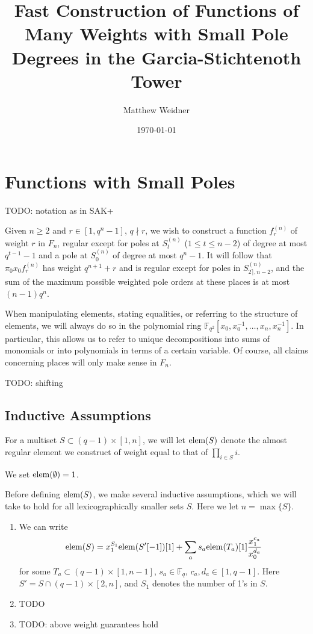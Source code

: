 \documentclass[12pt]{article}
\newcommand{\mb}[1]{\ensuremath{\mathbb{#1}}}
\newcommand{\F}{\mb{F}}
\newcommand{\elem}{\ensuremath{{\rm elem}}}
\theoremstyle{plain}
\theoremstyle{definition}
\begin{document}
\title{Fast Construction of Functions of Many Weights with Small Pole Degrees in the Garcia-Stichtenoth Tower}
\author{Matthew Weidner}
\date{\today}
\maketitle
\vspace{-10pt}


\section{Functions with Small Poles}
TODO: notation as in SAK+

Given $n \ge 2$ and $r \in [1, q^n - 1]$, $q \nmid r$, we wish to construct a function $f^{(n)}_r$ of weight $r$ in $F_n$, regular except for poles at $S^{(n)}_t$ ($1 \le t \le n-2$) of degree at most $q^{t-1} - 1$ and a pole at $S^{(n)}_0$ of degree at most $q^n - 1$.  It will follow that $\pi_0 x_0 f^{(n)}_r$ has weight $q^{n+1} + r$ and is regular except for poles in $S^{(n)}_{2 \rceil, n-2}$, and the sum of the maximum possible weighted pole orders at these places is at most $(n-1)q^n$.

When manipulating elements, stating equalities, or referring to the structure of elements, we will always do so in the polynomial ring $\F_{q^2}[x_0, x_0^{-1}, \dots, x_n, x_n^{-1}]$.  In particular, this allows us to refer to unique decompositions into sums of monomials or into polynomials in terms of a certain variable.  Of course, all claims concerning places will only make sense in $F_n$.

TODO: shifting

\subsection{Inductive Assumptions}
For a multiset $S \subset (q - 1) \times [1, n]$, we will let $\elem(S)$ denote the almost regular element we construct of weight equal to that of $\prod_{i \in S} i$.

We set $\elem(\emptyset) = 1$.

Before defining $\elem(S)$, we make several inductive assumptions, which we will take to hold for all lexicographically smaller sets $S$.  Here we let $n = \max\{S\}$.
\begin{enumerate}[(A1)]
  \item We can write
  \[
  \elem(S) = x_1^{S_1} \elem(S'[-1])[1] + \sum_a s_a \elem(T_a)[1] \frac{x_1^{c_a}}{x_0^{d_a}}
  \]
  for some $T_a \subset (q- 1) \times [1, n-1]$, $s_a \in \F_q$, $c_a, d_a \in [1, q-1]$.  Here $S' = S \cap (q - 1) \times [2, n]$, and $S_1$ denotes the number of 1's in $S$.
  
  \item TODO
  
  \item TODO: above weight guarantees hold
\end{enumerate}
\end{document}
